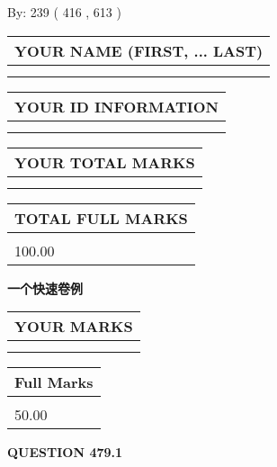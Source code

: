 \documentclass{ctexart}
\begin{document}
   
\hspace{1.0in} By: 
 239 ( 416 ,  613 )
   
   
   
   
\newpage 
\setcounter{page}{ 
   479001 } 
   
   
   
   
\noindent\begin{tabular}{|l|}
\hline
YOUR NAME (FIRST, ... LAST)  \\
\hline
 \\ 
 \\ 
\hline
\end{tabular}
\hspace{0.05in} \begin{tabular}{|l|}
\hline
 YOUR   ID   INFORMATION  \\
\hline
 \\ 
 \\ 
\hline
\end{tabular}
   
   
\vspace{0.2in}\noindent\begin{tabular}{|l|}
\hline
YOUR TOTAL MARKS  \\
\hline
 \\ 
 \\ 
\hline
\end{tabular}
\hspace{0.05in} \begin{tabular}{|l|}
\hline
TOTAL FULL MARKS  \\
\hline
 \\ 
100.00 \\
\hline
\end{tabular}
   
   
 \vspace{0.2in}
{\LARGE {\textbf{ 一个快速卷例}}}
   
   
  
\vspace{0.2in}
  
\noindent\begin{tabular}{|l|}
\hline
 YOUR MARKS  \\
\hline
 \\ 
 \\ 
\hline
\end{tabular}
\hspace{0.05in} \begin{tabular}{|l|}
\hline
 Full Marks  \\
\hline
 \\ 
50.00 \\
\hline
\end{tabular}
{\textbf{\Large{QUESTION
479.1 
}}}
  
\end{document}
